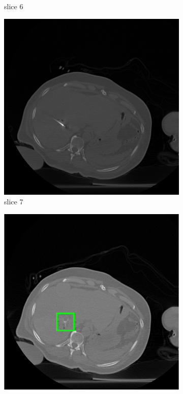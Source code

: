 \documentclass[journal]{IEEEtran}
\begin{document}
\begin{figure}[h!]
\begin{subfigure}[b]{0.24\linewidth}
 \caption{slice 6}
    \end{subfigure}
       \begin{subfigure}[b]{0.24\linewidth}
        \includegraphics[width=\textwidth]{../images/tmh/RFA2/template7.png}
 \caption{slice 7}
    \end{subfigure}
       \begin{subfigure}[b]{0.24\linewidth}
        \includegraphics[width=\textwidth]{../images/tmh/RFA2/colorTestIm_ablation.png}

\end{subfigure}
\end{figure}
\end{document}
